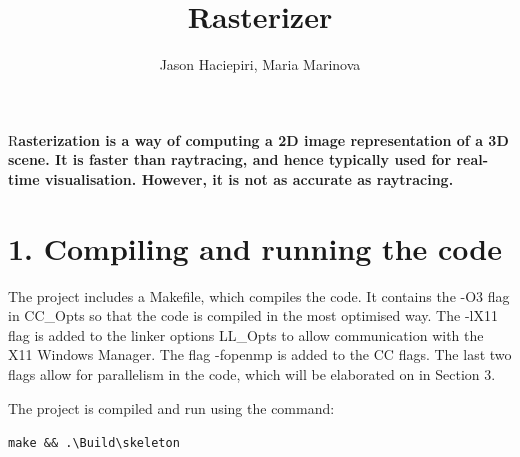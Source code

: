 \documentclass[DIV=calc, paper=a4, fontsize=11pt, twocolumn]{article}	 %
\title{Rasterizer} %
\author{Jason Haciepiri, Maria Marinova} %
\date{\vspace{-30pt}} %
\newcommand{\initial}[1]{ %
	\lettrine[lines=3,lhang=0.3,nindent=0em]{
		\color{Goldenrod}
		{\textsf{#1}}}{}}
\begin{document}
	
	\maketitle %
	
	\thispagestyle{fancy} %
	
	
	\initial{R}\textbf{asterization is a way of computing a 2D image representation of a 3D scene. It is faster than raytracing, and hence typically used for real-time visualisation. However, it is not as accurate as raytracing.}
	
	
	\section*{1. Compiling and running the code}

	The project includes a Makefile, which compiles the code. It contains the -O3 flag in CC\_Opts so that the code is compiled in the most optimised way. The -lX11 flag is added to the linker options LL\_Opts to allow communication with the X11 Windows Manager. The flag -fopenmp is added to the CC flags. The last two flags allow for parallelism in the code, which will be elaborated on in Section 3. 
	\par
	The project is compiled and run using the command: \par
		\texttt{make \&\&  .\textbackslash Build\textbackslash skeleton}
 
\end{document}

